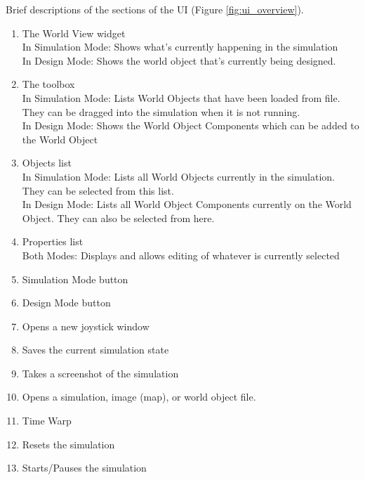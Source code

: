  Brief descriptions of the sections of the UI (Figure \ref{fig:ui_overview}).
 \begin{enumerate}
 	\item The World View widget\\
 	In Simulation Mode: Shows what's currently happening in the simulation\\
 	In Design Mode: Shows the world object that's currently being designed.
 	\item The toolbox\\
 	In Simulation Mode: Lists World Objects that have been loaded from file. They can be dragged into the simulation when it is not running.\\
 	In Design Mode: Shows the World Object Components which can be added to the World Object
 	\item Objects list\\
 	In Simulation Mode: Lists all World Objects currently in the simulation. They can be selected from this list.\\
 	In Design Mode: Lists all World Object Components currently on the World Object. They can also be selected from here.
 	\item Properties list\\
 	Both Modes: Displays and allows editing of whatever is currently selected
 	\item Simulation Mode button
 	\item Design Mode button
 	\item Opens a new joystick window
 	\item Saves the current simulation state
 	\item Takes a screenshot of the simulation
 	\item Opens a simulation, image (map), or world object file.
 	\item Time Warp
 	\item Resets the simulation
 	\item Starts/Pauses the simulation
 \end{enumerate}
 
